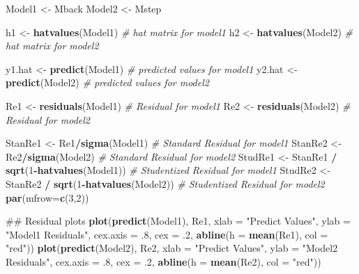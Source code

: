 \documentclass[]{article}
\newenvironment{Shaded}{\begin{snugshade}}{\end{snugshade}}
\newcommand{\KeywordTok}[1]{\textcolor[rgb]{0.13,0.29,0.53}{\textbf{#1}}}
\newcommand{\DataTypeTok}[1]{\textcolor[rgb]{0.13,0.29,0.53}{#1}}
\newcommand{\DecValTok}[1]{\textcolor[rgb]{0.00,0.00,0.81}{#1}}
\newcommand{\StringTok}[1]{\textcolor[rgb]{0.31,0.60,0.02}{#1}}
\newcommand{\CommentTok}[1]{\textcolor[rgb]{0.56,0.35,0.01}{\textit{#1}}}
\newcommand{\OperatorTok}[1]{\textcolor[rgb]{0.81,0.36,0.00}{\textbf{#1}}}
\newcommand{\NormalTok}[1]{#1}
\begin{document}
\begin{Shaded}
\begin{Highlighting}[]
\NormalTok{Model1 <-}\StringTok{ }\NormalTok{Mback}
\NormalTok{Model2 <-}\StringTok{ }\NormalTok{Mstep}

\NormalTok{h1 <-}\StringTok{ }\KeywordTok{hatvalues}\NormalTok{(Model1) }\CommentTok{# hat matrix for model1 }
\NormalTok{h2 <-}\StringTok{ }\KeywordTok{hatvalues}\NormalTok{(Model2) }\CommentTok{# hat matrix for model2}

\NormalTok{y1.hat <-}\StringTok{ }\KeywordTok{predict}\NormalTok{(Model1) }\CommentTok{# predicted values for model1 }
\NormalTok{y2.hat <-}\StringTok{ }\KeywordTok{predict}\NormalTok{(Model2) }\CommentTok{# predicted values for model2 }

\NormalTok{Re1 <-}\StringTok{ }\KeywordTok{residuals}\NormalTok{(Model1) }\CommentTok{# Residual for model1}
\NormalTok{Re2 <-}\StringTok{ }\KeywordTok{residuals}\NormalTok{(Model2) }\CommentTok{# Residual for model2}

\NormalTok{StanRe1 <-}\StringTok{ }\NormalTok{Re1}\OperatorTok{/}\KeywordTok{sigma}\NormalTok{(Model1) }\CommentTok{# Standard Residual for model1 }
\NormalTok{StanRe2 <-}\StringTok{ }\NormalTok{Re2}\OperatorTok{/}\KeywordTok{sigma}\NormalTok{(Model2) }\CommentTok{# Standard Residual for model2}
\NormalTok{StudRe1 <-}\StringTok{ }\NormalTok{StanRe1 }\OperatorTok{/}\StringTok{ }\KeywordTok{sqrt}\NormalTok{(}\DecValTok{1}\OperatorTok{-}\KeywordTok{hatvalues}\NormalTok{(Model1)) }\CommentTok{# Studentized Residual for model1 }
\NormalTok{StudRe2 <-}\StringTok{ }\NormalTok{StanRe2 }\OperatorTok{/}\StringTok{ }\KeywordTok{sqrt}\NormalTok{(}\DecValTok{1}\OperatorTok{-}\KeywordTok{hatvalues}\NormalTok{(Model2)) }\CommentTok{# Studentized Residual for model2}
\KeywordTok{par}\NormalTok{(}\DataTypeTok{mfrow=}\KeywordTok{c}\NormalTok{(}\DecValTok{3}\NormalTok{,}\DecValTok{2}\NormalTok{))}


\NormalTok{## Residual plots}
\KeywordTok{plot}\NormalTok{(}\KeywordTok{predict}\NormalTok{(Model1), Re1, }\DataTypeTok{xlab =} \StringTok{"Predict Values"}\NormalTok{,}
     \DataTypeTok{ylab =} \StringTok{"Model1 Residuals"}\NormalTok{, }\DataTypeTok{cex.axis =}\NormalTok{ .}\DecValTok{8}\NormalTok{, }\DataTypeTok{cex =}\NormalTok{ .}\DecValTok{2}\NormalTok{, }
     \KeywordTok{abline}\NormalTok{(}\DataTypeTok{h =} \KeywordTok{mean}\NormalTok{(Re1), }\DataTypeTok{col =} \StringTok{"red"}\NormalTok{))}
\KeywordTok{plot}\NormalTok{(}\KeywordTok{predict}\NormalTok{(Model2), Re2, }\DataTypeTok{xlab =} \StringTok{"Predict Values"}\NormalTok{,}
     \DataTypeTok{ylab =} \StringTok{"Model2 Residuals"}\NormalTok{, }\DataTypeTok{cex.axis =}\NormalTok{ .}\DecValTok{8}\NormalTok{, }\DataTypeTok{cex =}\NormalTok{ .}\DecValTok{2}\NormalTok{, }
     \KeywordTok{abline}\NormalTok{(}\DataTypeTok{h =} \KeywordTok{mean}\NormalTok{(Re2), }\DataTypeTok{col =} \StringTok{"red"}\NormalTok{))}


\end{Highlighting}
\end{Shaded}
\end{document}
